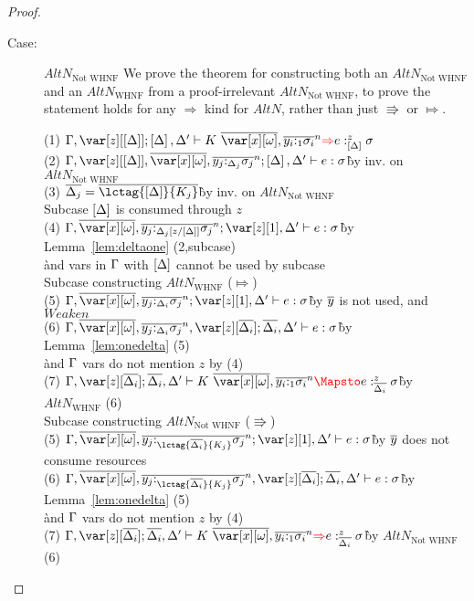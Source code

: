 \begin{proof}
\begin{description}
\item[Case:] $AltN_{\textrm{Not WHNF}}$
    We prove the theorem for constructing both an $AltN_{\textrm{Not WHNF}}$
        and an $AltN_{\textrm{WHNF}}$ from a proof-irrelevant $AltN_{\textrm{Not
        WHNF}}$, to prove the statement holds for any $\Rightarrow$ kind for
        $AltN$, rather than just $\Rrightarrow$ or $\Mapsto$.
\begin{tabbing}
    (1) $\G, \z[\irr{\D}]; \irr{\D}, \D' \vdash K~\ov{\xo},\ov{y_i{:}_{1}\s_i}^n\ROUNDTWO{\Rightarrow} e :^z_{\irr{\D}} \s $\\
    (2) $\G,\z[\irr{\D}],\ov{\xo},\ov{y_j{:}_{\D_j}\s_j}^n; \irr{\D}, \D' \vdash e : \s$\`by inv. on $AltN_{\textrm{Not WHNF}}$\\
    (3) $\ov{\D_j} = \ov{\lctag{\irr{\D}}{K_j}}$\`by inv. on $AltN_{\textrm{Not WHNF}}$\\
    Subcase $\left[\Delta\right]$ is consumed through $z$\\
    (4) $\G,\ov{\xo},\ov{y_j{:}_{\D_j[z/\irr{\D}]}\s_j}^n; \z[1], \D' \vdash e : \s$\`by Lemma~\ref{lem:deltaone} (2,subcase)\\\`and vars in $\Gamma$ with $\left[\Delta\right]$ cannot be used by subcase\\
    Subcase constructing $AltN_{\textrm{WHNF}}$ ($\Mapsto$)\\
    (5) $\G,\ov{\xo},\ov{y_j{:}_{\D_i}\s_j}^n; \z[1], \D' \vdash e : \s$\`by $\overline{y}$ is not used, and $Weaken$\\
    (6) $\G,\ov{\xo},\ov{y_j{:}_{\D_i}\s_j}^n, \z[\ov{\D_i}]; \ov{\D_i}, \D' \vdash e : \s$\`by Lemma~\ref{lem:onedelta} (5)\\\` and $\Gamma$ vars do not mention $z$ by (4) \\
    (7) $\G, \z[\ov{\D_i}]; \ov{\D_i}, \D' \vdash K~\ov{\xo},\ov{y_i{:}_{1}\s_i}^n \ROUNDTWO{\Mapsto} e :^z_{\ov{\D_i}} \s $\`by $AltN_{\textrm{WHNF}}$ (6)\\
    Subcase constructing $AltN_{\textrm{Not WHNF}}$ ($\Rrightarrow$)\\
    (5) $\G,\ov{\xo},\ov{y_j{:}_{\lctag{\ov{\D_i}}{K_j}}\s_j}^n; \z[1], \D' \vdash e : \s$\`by $\overline{y}$ does not consume resources\\
    (6) $\G,\ov{\xo},\ov{y_j{:}_{\lctag{\ov{\D_i}}{K_j}}\s_j}^n, \z[\ov{\D_i}]; \ov{\D_i}, \D' \vdash e : \s$\`by Lemma~\ref{lem:onedelta} (5)\\\` and $\Gamma$ vars do not mention $z$ by (4) \\
    (7) $\G, \z[\ov{\D_i}]; \ov{\D_i}, \D' \vdash K~\ov{\xo},\ov{y_i{:}_{1}\s_i}^n \ROUNDTWO{\Rightarrow} e :^z_{\ov{\D_i}} \s $\`by $AltN_{\textrm{Not WHNF}}$ (6)\\

\end{tabbing}
\end{description}
\end{proof}
